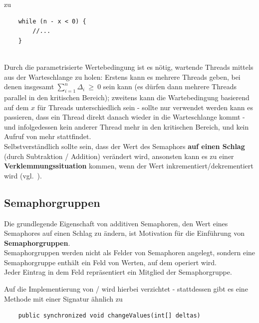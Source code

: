 zu

\begin{verbatim}
    while (n - x < 0) {
        //...
    }
\end{verbatim}\\

\noindent
Durch die parametrisierte Wertebedingung ist es nötig, wartende Threads mittels  aus der Warteschlange zu holen: Erstens kann es mehrere Threads geben, bei denen insgesamt $\sum_{i=1}^{n} \Delta_i\ \geq\ 0$ sein kann (es dürfen dann mehrere Threads parallel in den kritischen Bereich); zweitens kann die Wartebedingung basierend auf dem $x$ für Threads unterschiedlich sein - sollte nur  verwendet werden kann es passieren, dass ein Thread direkt danach wieder in die Warteschlange kommt - und infolgedessen kein anderer Thread mehr in den kritischen Bereich, und kein Aufruf von  mehr stattfindet.\\

\indent
Selbstverständlich sollte sein, dass der Wert des Semaphors \textbf{auf einen Schlag} (durch Subtraktion / Addition) verändert wird, ansonsten kann es zu einer \textbf{Verklemmungssituation} kommen, wenn der Wert inkrementiert/dekrementiert wird (vgl.~\cite[109]{Oec22}).

\subsection{Semaphorgruppen}

Die grundlegende Eigenschaft von additiven Semaphoren, den Wert eines Semaphores auf einen Schlag zu ändern, ist Motivation für die Einführung von \textbf{Semaphorgruppen}.\\

\noindent
Semaphorgruppen werden nicht als Felder von Semaphoren angelegt, sondern eine Semaphorgruppe enthält ein Feld von Werten, auf dem operiert wird.\\

\noindent
Jeder Eintrag in dem Feld repräsentiert ein Mitglied der Semaphorgruppe.


\noindent
Auf die Implementierung von / wird hierbei verzichtet - stattdessen gibt es eine Methode mit einer Signatur ähnlich zu

\begin{verbatim}
    public synchronized void changeValues(int[] deltas)
\end{verbatim}\\

